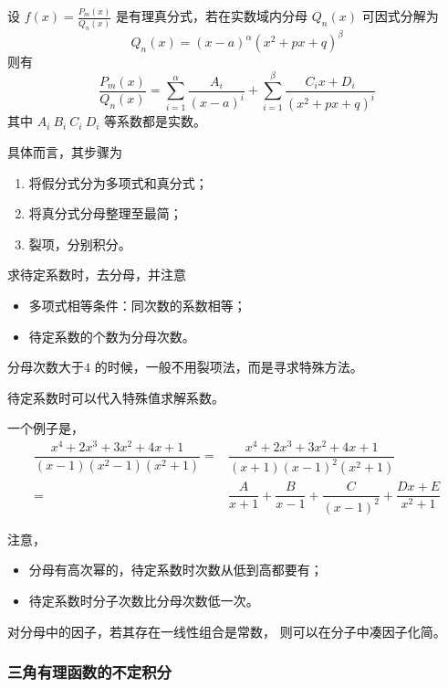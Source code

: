 \begin{Theo}[]

    设 $ f(x)=\frac{P_m(x)}{Q_n(x)}$ 是有理真分式，若在实数域内分母 $ Q_n(x) $ 可因式分解为 $$
        Q_n(x)=(x-a)^\alpha(x^2+px+q)^\beta
    $$ 
    则有$$
        \frac{P_m(x)}{Q_n(x)}=\sum_{i=1}^\alpha \frac{A_i}{(x-a)^i}+
        \sum_{i=1}^\beta \frac{C_ix+D_i}{(x^2+px+q)^i}
    $$ 其中 $ A_i\ B_i\ C_i\ D_i $ 等系数都是实数。
\end{Theo}

具体而言，其步骤为
\begin{enumerate}
    \item 将假分式分为多项式和真分式；
    \item 将真分式分母整理至最简；
    \item 裂项，分别积分。
\end{enumerate}

求待定系数时，去分母，并注意\begin{itemize}
    \item 多项式相等条件：同次数的系数相等；
    \item 待定系数的个数为分母次数。
\end{itemize}

分母次数大于$ 4 $ 的时候，一般不用裂项法，而是寻求特殊方法。

待定系数时可以代入特殊值求解系数。

一个例子是，
\begin{equation*}
    \begin{aligned}
        \dfrac{x^4+2x^3+3x^2+4x+1}{(x-1)(x^2-1)(x^2+1)}=&\dfrac{x^4+2x^3+3x^2+4x+1}{(x+1)(x-1)^2(x^2+1)}\\ 
        =& \dfrac{A}{x+1} + \dfrac{B}{x-1} + \dfrac{C}{(x-1)^2} + \dfrac{Dx+E}{x^2+1}
    \end{aligned}
\end{equation*}

注意，
\begin{itemize}
    \item 分母有高次幂的，待定系数时次数从低到高都要有；
    \item 待定系数时分子次数比分母次数低一次。
\end{itemize}

对分母中的因子，若其存在一线性组合是常数，
则可以在分子中凑因子化简。

\subsubsection{三角有理函数的不定积分}

